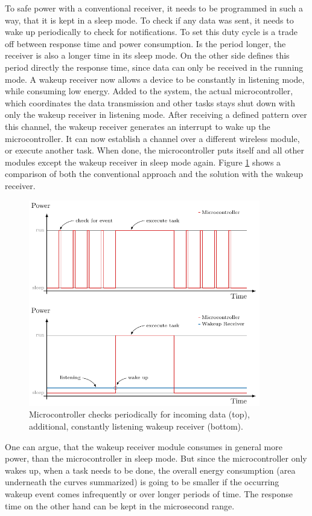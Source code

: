 To safe power with a conventional receiver, it needs to be programmed in such a way, that it is kept in a sleep mode.
To check if any data was sent, it needs to wake up periodically to check for notifications.
To set this duty cycle is a trade off between response time and power consumption.
Is the period longer, the receiver is also a longer time in its sleep mode.
On the other side defines this period directly the response time, since data can only be received in the running mode.
A wakeup receiver now allows a device to be constantly in listening mode, while consuming low energy.
Added to the system, the actual microcontroller, which coordinates the data transmission and other tasks stays shut down with only the wakeup receiver in listening mode.
After receiving a defined pattern over this channel, the wakeup receiver generates an interrupt to wake up the microcontroller. 
It can now establish a channel over a different wireless module, or execute another task.
When done, the microcontroller puts itself and all other modules except the wakeup receiver in sleep mode again.
Figure \ref{theory:wake} shows a comparison of both the conventional approach and the solution with the wakeup receiver. 
\begin{figure}[ht]
	\centering
	\includegraphics[width=0.9\textwidth]{2-theory/wakeup/graphics/wake_comp.pdf}
	\caption{Microcontroller checks periodically for incoming data (top), additional, constantly listening  wakeup receiver (bottom).\label{theory:wake}}
\end{figure}
One can argue, that the wakeup receiver module consumes in general more power, than the microcontroller in sleep mode.
But since the microcontroller only wakes up, when a task needs to be done, the overall energy consumption (area underneath the curves summarized) is going to be smaller if the occurring wakeup event comes infrequently or over longer periods of time.
The response time on the other hand can be kept in the microsecond range.